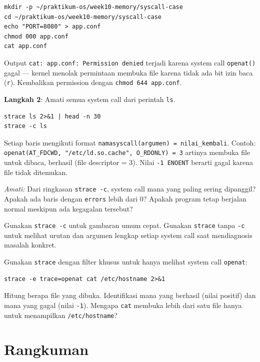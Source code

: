 \begin{lstlisting}[caption={Simulasi permission error}]
mkdir -p ~/praktikum-os/week10-memory/syscall-case
cd ~/praktikum-os/week10-memory/syscall-case
echo "PORT=8080" > app.conf
chmod 000 app.conf
cat app.conf
\end{lstlisting}

Output \texttt{cat: app.conf: Permission denied} terjadi karena system call
\texttt{openat()} gagal --- kernel menolak permintaan membuka file karena tidak ada
bit izin baca (\texttt{r}). Kembalikan permission dengan \texttt{chmod 644 app.conf}.

\textbf{Langkah 2}: Amati semua system call dari perintah \texttt{ls}.

\begin{lstlisting}[caption={Detail dan ringkasan system call}]
strace ls 2>&1 | head -n 30
strace -c ls
\end{lstlisting}

Setiap baris mengikuti format \texttt{namasyscall(argumen) = nilai\_kembali}.
Contoh: \texttt{openat(AT\_FDCWD, "/etc/ld.so.cache", O\_RDONLY) = 3} artinya
membuka file untuk dibaca, berhasil (file descriptor = 3). Nilai \texttt{-1 ENOENT}
berarti gagal karena file tidak ditemukan.

\textit{Amati:} Dari ringkasan \texttt{strace -c}, system call mana yang paling
sering dipanggil? Apakah ada baris dengan \texttt{errors} lebih dari 0? Apakah
program tetap berjalan normal meskipun ada kegagalan tersebut?

\begin{tipbox}
Gunakan \texttt{strace -c} untuk gambaran umum cepat. Gunakan \texttt{strace} tanpa
\texttt{-c} untuk melihat urutan dan argumen lengkap setiap system call saat
mendiagnosis masalah konkret.
\end{tipbox}

\begin{challengebox}
Gunakan \texttt{strace} dengan filter khusus untuk hanya melihat system call
\texttt{openat}:
\begin{lstlisting}
strace -e trace=openat cat /etc/hostname 2>&1
\end{lstlisting}
Hitung berapa file yang dibuka. Identifikasi mana yang berhasil (nilai positif)
dan mana yang gagal (nilai \texttt{-1}). Mengapa \texttt{cat} membuka lebih
dari satu file hanya untuk menampilkan \texttt{/etc/hostname}?
\end{challengebox}

\section{Rangkuman}

